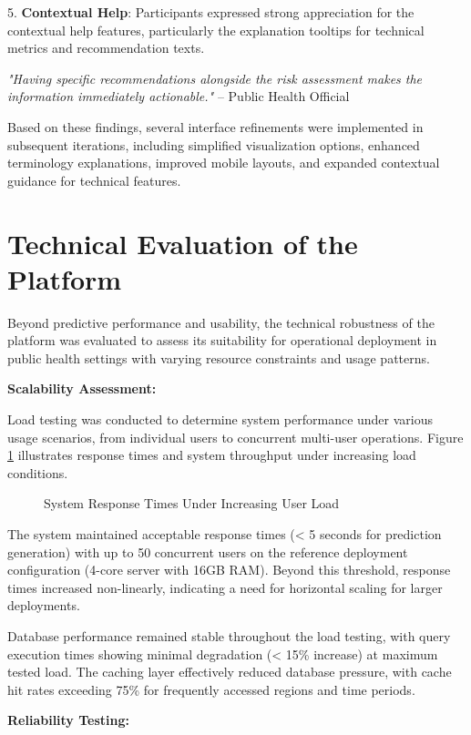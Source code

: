 \documentclass[12pt,a4paper]{report}
\begin{document}
5. \textbf{Contextual Help}: Participants expressed strong appreciation for the contextual help features, particularly the explanation tooltips for technical metrics and recommendation texts.

   \textit{"Having specific recommendations alongside the risk assessment makes the information immediately actionable."} – Public Health Official

Based on these findings, several interface refinements were implemented in subsequent iterations, including simplified visualization options, enhanced terminology explanations, improved mobile layouts, and expanded contextual guidance for technical features.

\section{Technical Evaluation of the Platform}
Beyond predictive performance and usability, the technical robustness of the platform was evaluated to assess its suitability for operational deployment in public health settings with varying resource constraints and usage patterns.

\textbf{Scalability Assessment:}

Load testing was conducted to determine system performance under various usage scenarios, from individual users to concurrent multi-user operations. Figure \ref{fig:scalability} illustrates response times and system throughput under increasing load conditions.

\begin{figure}[h]
\centering
\caption{System Response Times Under Increasing User Load}
\label{fig:scalability}
\end{figure}

The system maintained acceptable response times (< 5 seconds for prediction generation) with up to 50 concurrent users on the reference deployment configuration (4-core server with 16GB RAM). Beyond this threshold, response times increased non-linearly, indicating a need for horizontal scaling for larger deployments.

Database performance remained stable throughout the load testing, with query execution times showing minimal degradation (< 15\% increase) at maximum tested load. The caching layer effectively reduced database pressure, with cache hit rates exceeding 75\% for frequently accessed regions and time periods.

\textbf{Reliability Testing:}
\end{document}
